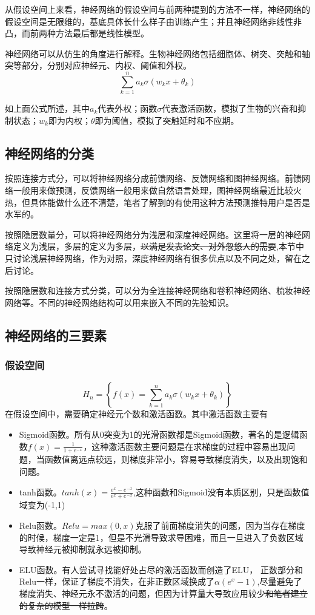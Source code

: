 \documentclass[10pt, a4paper]{article}
\begin{document}
从假设空间上来看，神经网络的假设空间与前两种提到的方法不一样，神经网络的假设空间是无限维的，基底具体长什么样子由训练产生；并且神经网络非线性非凸，而前两种方法最后都是线性模型。

神经网络可以从仿生的角度进行解释。生物神经网络包括细胞体、树突、突触和轴突等部分，分别对应神经元、内权、阈值和外权。
$$\sum_{k=1}^{n}a_k\sigma(w_k x+\theta_k)$$

如上面公式所述，其中$a_k$代表外权；函数$\sigma$代表激活函数，模拟了生物的兴奋和抑制状态；$w_k$即为内权；$\theta$即为阈值，模拟了突触延时和不应期。

\subsection{神经网络的分类}

按照连接方式分，可以将神经网络分成前馈网络、反馈网络和图神经网络。前馈网络一般用来做预测，反馈网络一般用来做自然语言处理，图神经网络最近比较火热，但具体能做什么还不清楚，笔者了解到的有使用这种方法预测推特用户是否是水军的。

按照隐层数量分，可以将神经网络分为浅层和深度神经网络。这里将一层的神经网络定义为浅层，多层的定义为多层，\sout{以满足发表论文、对外忽悠人的需要},本节中只讨论浅层神经网络，作为对照，深度神经网络有很多优点以及不同之处，留在之后讨论。

按照隐层数和连接方式分类，可以分为全连接神经网络和卷积神经网络、梳妆神经网络等。不同的神经网络结构可以用来嵌入不同的先验知识。

\subsection{神经网络的三要素}
\subsubsection{假设空间}
$$H_n=\left\{f(x)=\sum_{k=1}^{n}a_k\sigma(w_k x+\theta_k)\right\}$$
在假设空间中，需要确定神经元个数和激活函数。其中激活函数主要有
\begin{itemize}
	\item Sigmoid函数。所有从0突变为1的光滑函数都是Sigmoid函数，著名的是逻辑函数$f(x)=\frac{1}{1+e^{-x}}$，这种激活函数主要问题是在求梯度的过程中容易出现问题，当函数值离远点较远，则梯度非常小，容易导致梯度消失，以及出现饱和问题。
	\item tanh函数。$tanh(x)=\frac{e^x-e^{-x}}{e^x+e^{-x}}$,这种函数和Sigmoid没有本质区别，只是函数值域变为(-1,1)
	\item Relu函数。$Relu=max(0,x)$克服了前面梯度消失的问题，因为当存在梯度的时候，梯度一定是1，但是不光滑导致求导困难，而且一旦进入了负数区域导致神经元被抑制就永远被抑制。
	\item ELU函数。有人尝试寻找能好处占尽的激活函数而创造了ELU， 正数部分和Relu一样，保证了梯度不消失，在非正数区域换成了$\alpha(e^{x}-1)$,尽量避免了梯度消失、神经元永不激活的问题，但因为计算量大导致应用较少\sout{和笔者建立的复杂的模型一样拉跨}。
\end{itemize}
\end{document}
